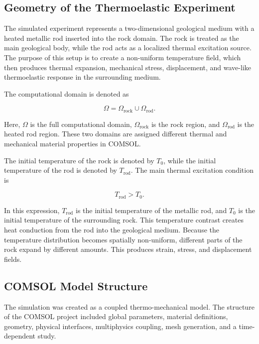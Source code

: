 \subsection{Geometry of the Thermoelastic Experiment}

The simulated experiment represents a two-dimensional geological medium with a heated metallic rod inserted into the rock domain. The rock is treated as the main geological body, while the rod acts as a localized thermal excitation source. The purpose of this setup is to create a non-uniform temperature field, which then produces thermal expansion, mechanical stress, displacement, and wave-like thermoelastic response in the surrounding medium.

The computational domain is denoted as

\begin{equation}
\Omega =
\Omega_{\mathrm{rock}}
\cup
\Omega_{\mathrm{rod}} .
\end{equation}

Here, \(\Omega\) is the full computational domain, \(\Omega_{\mathrm{rock}}\) is the rock region, and \(\Omega_{\mathrm{rod}}\) is the heated rod region. These two domains are assigned different thermal and mechanical material properties in COMSOL.

The initial temperature of the rock is denoted by \(T_0\), while the initial temperature of the rod is denoted by \(T_{\mathrm{rod}}\). The main thermal excitation condition is

\begin{equation}
T_{\mathrm{rod}} > T_0 .
\end{equation}

In this expression, \(T_{\mathrm{rod}}\) is the initial temperature of the metallic rod, and \(T_0\) is the initial temperature of the surrounding rock. This temperature contrast creates heat conduction from the rod into the geological medium. Because the temperature distribution becomes spatially non-uniform, different parts of the rock expand by different amounts. This produces strain, stress, and displacement fields.

\subsection{COMSOL Model Structure}

The simulation was created as a coupled thermo-mechanical model. The structure of the COMSOL project included global parameters, material definitions, geometry, physical interfaces, multiphysics coupling, mesh generation, and a time-dependent study.

